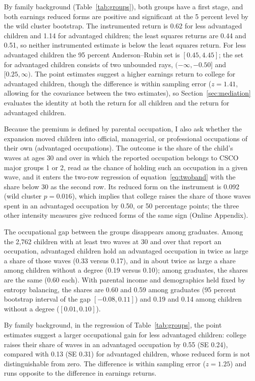 \documentclass[11pt]{article}
\begin{document}
By family background (Table~\ref{tab:groups}), both groups have a first stage, and both earnings reduced forms are positive and significant at the 5 percent level by the wild cluster bootstrap. The instrumented return is 0.62
for less advantaged children and 1.14 for advantaged children; the least squares returns are 0.44 and 0.51, so neither instrumented estimate is below the least squares return. For less advantaged children the 95 percent Anderson--Rubin set is $[0.45, 4.45]$; the set for advantaged children consists of two unbounded rays, $(-\infty, -0.50]$ and $[0.25, \infty)$. The point estimates suggest a higher earnings return to college for advantaged children, though the difference is within sampling error ($z = 1.41$, allowing for the covariance between the two estimates), so Section~\ref{sec:mediation} evaluates the identity at both the return for all children and the return for advantaged children.

\label{sec:occupation}
Because the premium is defined by parental occupation, I also ask whether the expansion moved
children into official, managerial, or professional occupations of their own (advantaged occupations). The outcome
is the share of the child's waves at ages 30 and over in which the
reported occupation belongs to CSCO major groups 1 or 2, read as the chance of holding such an occupation in a given wave, and it enters the two-row regression of equation~\eqref{eq:twoband} with the share below 30 as the second row. Its reduced form on the instrument is 0.092 (wild cluster $p = 0.016$), which implies that college raises the share of those waves spent in an advantaged occupation by 0.50, or 50 percentage points; the three other intensity measures give reduced forms of the same sign (Online Appendix).

The occupational gap between the groups disappears among graduates. Among the 2,762 children with at least two waves at 30 and over that report an occupation, advantaged children hold an advantaged occupation in twice as large a share of those waves (0.33 versus 0.17), and in about twice as large a share among children without a degree (0.19 versus 0.10); among graduates, the shares are the same (0.60 each). With parental income and demographics held fixed by entropy balancing, the shares are 0.60 and 0.59 among graduates (95 percent bootstrap interval of the gap $[-0.08, 0.11]$) and 0.19 and 0.14 among children without a degree ($[0.01, 0.10]$).

By family background, in the regression of Table~\ref{tab:groups}, the point estimates suggest a larger occupational gain for less advantaged children: college raises their share of waves in an advantaged occupation by 0.55 (SE 0.24), compared with 0.13 (SE 0.31) for advantaged children, whose reduced form is not distinguishable from zero. The difference is within sampling error ($z = 1.25$) and runs opposite to the difference in earnings returns.
\end{document}
